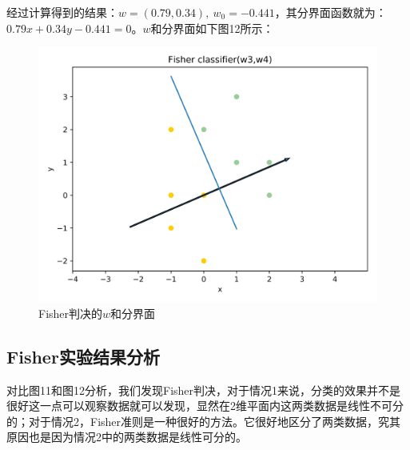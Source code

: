 \documentclass{article}
\newcommand{\hs}{\hspace{2em}}
\begin{document}
{}

\hs 经过计算得到的结果：$w=(0.79,0.34),~w_0=-0.441$，其分界面函数就为：$0.79x+0.34y-0.441 =0 $。$w$和分界面如下图12所示：
\begin{figure}[htbp]
	\centering
	\includegraphics[width=0.6\linewidth]{img//fig11}
	\caption{Fisher判决的$w$和分界面}
\end{figure}

\subsection{Fisher实验结果分析}
\hs 对比图11和图12分析，我们发现Fisher判决，对于情况1来说，分类的效果并不是很好这一点可以观察数据就可以发现，显然在2维平面内这两类数据是线性不可分的；对于情况2，Fisher准则是一种很好的方法。它很好地区分了两类数据，究其原因也是因为情况2中的两类数据是线性可分的。
\end{document}
